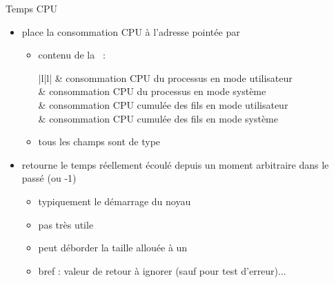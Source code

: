 \begin {frame} {Temps CPU}

    \begin {itemize}
	\item place la consommation CPU à l'adresse pointée par 
	    \begin {itemize}
		\item contenu de la ~:

		    \vspace* {-3mm}

		    \ctableau {\fD} {|l|l|} {
			\rc {}
			    & consommation CPU du processus
				en mode utilisateur \\
			\rc {}
			    & consommation CPU du processus
				en mode système \\
			\rc {}
			    & consommation CPU cumulée des fils
				en mode utilisateur \\
			\rc {}
			    & consommation CPU cumulée des fils
				en mode système \\
		    }

		    \vspace* {1mm}

		\item tous les champs sont de type 
	    \end {itemize}

	\item retourne le temps réellement écoulé depuis un moment
	    arbitraire dans le passé (ou -1)

	    \begin {itemize}
		\item typiquement le démarrage du noyau
		\item pas très utile
		\item peut déborder la taille allouée à un 
		\item bref : valeur de retour à ignorer (sauf pour test
		    d'erreur)...
	    \end {itemize}

    \end {itemize}
\end {frame}

